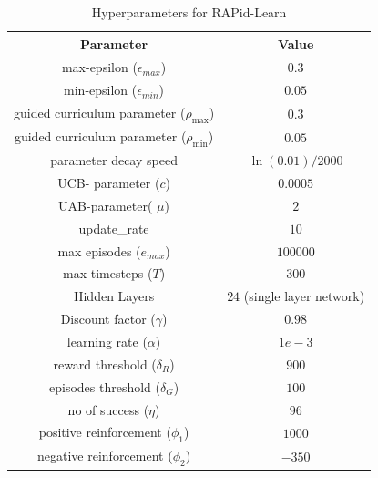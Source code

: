 % 
\begin{table}[h]
\begin{center}
\small
\begin{tabular}{@{}cc@{}}
 \arrayrulecolor{taupegray}\toprule
    \textbf{Parameter} & \textbf{Value} \\ \midrule
    max-epsilon ($\epsilon_{max}$) & $0.3$ \\ \midrule
    min-epsilon ($\epsilon_{min}$) & $0.05$ \\ \midrule
    guided curriculum parameter ($\rho_{\text{max}}$) & $0.3$ \\ \midrule
    guided curriculum parameter ($\rho_{\text{min}}$) & $0.05$ \\ \midrule
    parameter decay speed & $\ln(0.01)/2000$ \\ \midrule
    UCB- parameter ($c$) & $0.0005$ \\ \midrule
    UAB-parameter( $\mu$) &$2$  \\ \midrule
    update\_rate & $10$ \\ \midrule
    max episodes ($e_{max}$) & $100000$ \\ \midrule
    max timesteps ($T$) & $300$ \\ \midrule
    Hidden Layers & $24$ (single layer network) \\ \midrule
    Discount factor ($\gamma$) & $0.98$ \\ \midrule
    learning rate ($\alpha$) & $1e-3$ \\ \midrule
    reward threshold ($\delta_{R}$) & $900$ \\ \midrule
    episodes threshold ($\delta_{G}$) & $100$ \\ \midrule
    no of success ($\eta$) & $96$ \\ \midrule
    positive reinforcement ($\phi_1$) & $1000$ \\ \midrule
    negative reinforcement ($\phi_2$) & $-350$ \\ \midrule
\end{tabular}
\end{center}
\caption{Hyperparameters for RAPid-Learn}
\label{tab:hyper_rapid}
\end{table}
% 